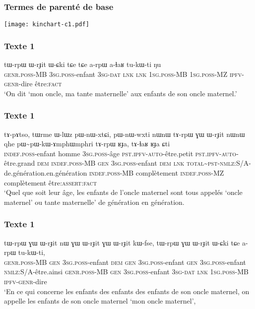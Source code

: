 \documentclass[xcolor=table]{beamer}
\newcommand{\tld}{\textasciitilde{}}
\newcommand{\ipa}[1]{{\phon #1}} %
\begin{document}
  \begin{frame} 
 \frametitle{Termes de parenté de base} 
\texttt{[image: kinchart-c1.pdf]}
\end{frame}

  \begin{frame} 
 \frametitle{Texte 1} 
 \begin{exe}
\ex 
\gll 
 \ipa{tɯ-rpɯ} 	\ipa{ɯ-rɟit} 	\ipa{ɯ-ɕki} 	\ipa{tɕe} 	\ipa{tɕe} 	\ipa{a-rpɯ} \ipa{a-ɬaʁ} 	\ipa{tu-kɯ-ti} 	\ipa{ŋu}  \\
 \textsc{genr.poss}-MB \textsc{3sg.poss}-enfant \textsc{3sg-dat} \textsc{lnk}  \textsc{lnk}  \textsc{1sg.poss}-MB \textsc{1sg.poss}-MZ \textsc{ipfv-genr}-dire être:\textsc{fact} \\
\glt `On dit `mon oncle, ma tante maternelle' aux enfants de son oncle maternel.'
\end{exe}

\end{frame}

  \begin{frame} 
 \frametitle{Texte 1} 
\begin{exe}
\ex 
\gll 
\ipa{tɤ-pɤtso,} 	\ipa{tɯrme} 	\ipa{ɯ-lɯz} 	\ipa{pɯ-nɯ-xtɕi,} 	\ipa{pɯ-nɯ-wxti} 	\ipa{nɯnɯ} 	\ipa{tɤ-rpɯ} 	\ipa{ɣɯ} 	\ipa{ɯ-rɟit} 	\ipa{nɯnɯ} 	\ipa{qhe} 	\ipa{pɯ\tld{}pɯ-kɯ-ɤmphɯmphri} 	\ipa{tɤ-rpɯ} 	\ipa{ʁɟa,} 	\ipa{tɤ-ɬaʁ} 	\ipa{ʁɟa} 	\ipa{ɕti}   \\
 \textsc{indef.poss}-enfant homme  \textsc{3sg.poss}-âge \textsc{pst.ipfv-auto}-être.petit \textsc{pst.ipfv-auto}-être.grand \textsc{dem}    \textsc{indef.poss}-MB \textsc{gen} \textsc{3sg.poss}-enfant \textsc{dem} \textsc{lnk} \textsc{total\tld{}pst-nmlz:S/A}-de.génération.en.génération \textsc{indef.poss}-MB complètement \textsc{indef.poss}-MZ complètement être:\textsc{assert}:\textsc{fact} \\
\glt `Quel que soit leur âge, les enfants de l'oncle maternel sont tous appelés `oncle maternel' ou   tante maternelle' de génération en génération. 
\end{exe}
\end{frame}

  \begin{frame} 
 \frametitle{Texte 1} 
 \begin{exe}
\ex 
\gll 
\ipa{tɯ-rpɯ} 	\ipa{ɣɯ} 	\ipa{ɯ-rɟit} 	\ipa{nɯ} 	\ipa{ɣɯ} 	\ipa{ɯ-rɟit} 	\ipa{ɣɯ} 	\ipa{ɯ-rɟit} 	\ipa{kɯ-fse,}  \ipa{tɯ-rpɯ} 	\ipa{ɣɯ} 	\ipa{ɯ-rɟit} 	\ipa{ɯ-ɕki} 	\ipa{tɕe} 	\ipa{a-rpɯ} 	\ipa{tu-kɯ-ti,} \\
\textsc{genr.poss}-MB \textsc{gen} \textsc{3sg.poss}-enfant \textsc{dem} \textsc{gen} \textsc{3sg.poss}-enfant \textsc{gen} \textsc{3sg.poss}-enfant \textsc{nmlz}:S/A-être.ainsi \textsc{genr.poss}-MB  \textsc{gen} \textsc{3sg.poss}-enfant \textsc{3sg-dat} \textsc{lnk} \textsc{1sg.poss}-MB \textsc{ipfv-genr}-dire \\
\glt `En ce qui concerne les enfants des enfants des enfants de son oncle maternel, on appelle les enfants de son oncle maternel `mon oncle maternel',
\end{exe}
\end{frame}
\end{document}
